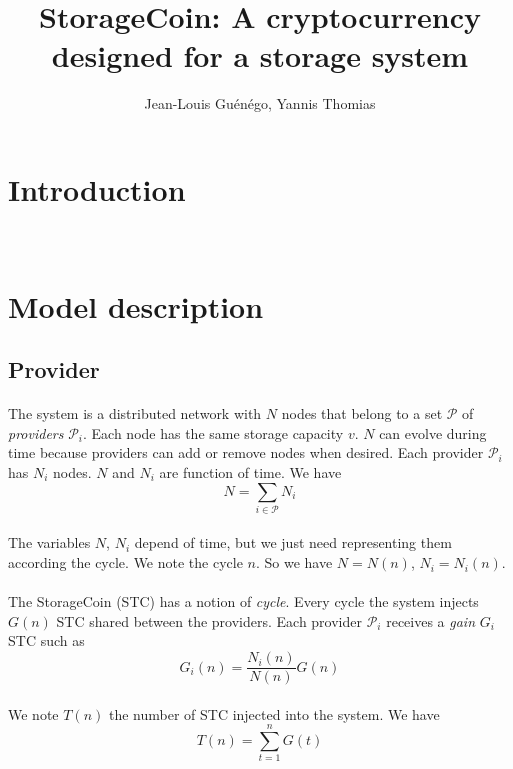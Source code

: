 \documentclass[a4paper,12pt]{article}
\title{StorageCoin: A cryptocurrency designed for a storage system}
\author{Jean-Louis Gu\'{e}n\'{e}go, Yannis Thomias}
\date{}
\begin{document}
\maketitle
\tableofcontents

\section{Introduction}
~\cite{bitcoin}
~\cite{peercoin}
~\cite{smallcell}

\section{Model description}
\subsection{Provider}

\paragraph*{}
The system is a distributed network with $N$ nodes that belong to a set $\mathscr{P}$ of \emph{providers} $\mathscr{P}_{i}$.
Each node has the same storage capacity $v$.
$N$ can evolve during time because providers can add or remove nodes  when desired. Each provider $\mathscr{P}_{i}$ has $N_{i}$ nodes.
$N$ and $N_{i}$ are function of time. We have 
\[N=\sum\limits_{i\in{\mathscr{P}}}N_{i}\]

\paragraph*{}
The variables $N$, $N_{i}$ depend of time, but we just need representing them according the cycle. We note the cycle $n$.
So we have $N=N(n)$, $N_{i}=N_{i}(n)$. 

\paragraph*{}
The StorageCoin (STC) has a notion of \emph{cycle}.
Every cycle the system injects $G(n)$ STC shared between the providers.
Each provider $\mathscr{P}_{i}$ receives a \emph{gain} $G_{i}$ STC such as
\[G_{i}(n)=\frac{N_{i}(n)}{N(n)}G(n)\]

\paragraph*{}
We note $T(n)$ the number of STC injected into the system. We have
\[T(n)=\sum\limits_{t=1}^{n}G(t)\]
\end{document}
